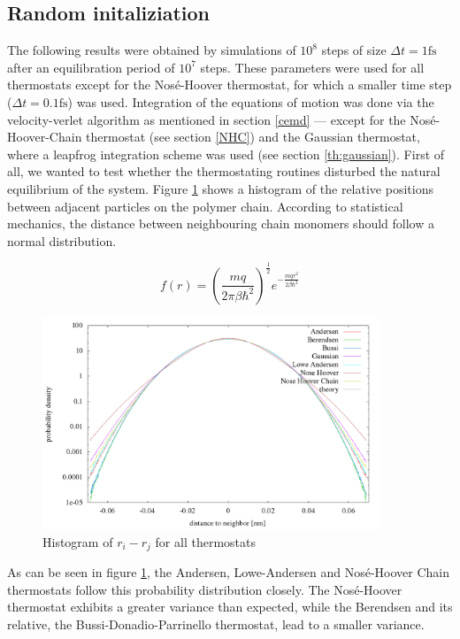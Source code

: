 \subsection{Random initaliziation}
The following results were obtained by simulations of $10^8$ steps of size $\Delta t = 1 \text{fs}$ after an equilibration period of $10^7$ steps. These parameters were used for all thermostats except for the Nosé-Hoover thermostat, for which a smaller time step ($\Delta t = 0.1 \text{fs}$) was used. Integration of the equations of motion was done via the velocity-verlet algorithm as mentioned in section \ref{cemd} --- except for the Nosé-Hoover-Chain thermostat (see section \ref{NHC}) and the Gaussian thermostat, where a leapfrog integration scheme was used (see section \ref{th:gaussian}).   
First of all, we wanted to test whether the thermostating routines disturbed the natural equilibrium of the system. Figure \ref{im:relPos_rand} shows a histogram of the relative positions between adjacent particles on the polymer chain. According to statistical mechanics, the distance between neighbouring chain monomers should follow a normal distribution.

\begin{equation}
f(r) = \left(\frac{mq}{2\pi\beta\hbar^2}\right)^{\frac{1}{2}}e^{-\frac{mqr^2}{2\beta\hbar^2}}
\end{equation}  

\begin{figure}[H]
\centering
\includegraphics[width=0.9\textwidth]{./graphics/Histogramm_relPos_rand_T=20_p=64.png}
\caption{Histogram of $r_i - r_j$ for all thermostats}
\label{im:relPos_rand}
\end{figure} 
As can be seen in figure \ref{im:relPos_rand}, the Andersen, Lowe-Andersen and Nosé-Hoover Chain thermostats follow this probability distribution closely. The Nosé-Hoover thermostat exhibits a greater variance than expected, while the Berendsen and its relative, the Bussi-Donadio-Parrinello thermostat,  lead to a smaller variance. 

